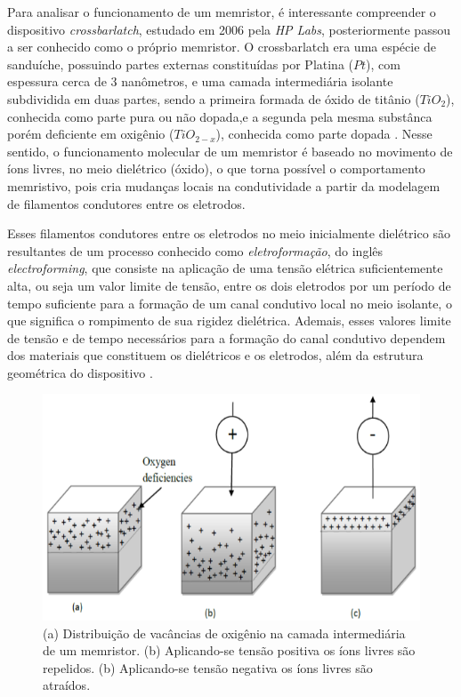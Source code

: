 \documentclass{ceel}
\begin{document}
\begin{multicols}{2}
Para analisar o funcionamento de um memristor, é interessante compreender o dispositivo \emph{crossbarlatch}, estudado em 2006 pela
\emph{HP Labs}, posteriormente passou a ser conhecido como o próprio memristor. O crossbarlatch era uma espécie de sanduíche, possuindo partes externas constituídas por Platina ($Pt$), com espessura cerca de 3 nanômetros, e uma camada intermediária isolante subdividida em duas partes, sendo a primeira formada de óxido de titânio ($TiO_2$), conhecida como parte pura ou não dopada,e a segunda pela mesma substânca porém deficiente em oxigênio ($TiO_{2-x}$), conhecida como parte dopada \cite{construcao}.  Nesse sentido, o funcionamento molecular de um memristor é baseado no movimento de íons livres, no meio dielétrico (óxido), o que torna possível o comportamento memristivo, pois cria mudanças locais na condutividade a partir da modelagem de filamentos condutores entre os eletrodos.

Esses filamentos condutores entre os eletrodos no meio inicialmente dielétrico são resultantes de um processo conhecido como \emph{eletroformação}, do inglês \emph{electroforming}, que consiste na aplicação de uma tensão elétrica suficientemente alta, ou seja um valor limite de tensão, entre os dois eletrodos por um período de tempo suficiente para a formação de um canal condutivo local no meio isolante, o que significa o rompimento de sua rigidez dielétrica.
Ademais, esses valores limite de tensão e de tempo necessários para a formação do canal condutivo dependem dos materiais que constituem os dielétricos e os eletrodos, além da estrutura geométrica do dispositivo \cite{us}. 

\vspace{-0.26cm}
\begin{figure}[H]
\centering
\includegraphics[width=\columnwidth]{oxygen-vacancies}
\caption{(a) Distribuição de vacâncias de oxigênio na camada intermediária de um memristor. (b) Aplicando-se tensão positiva os íons livres são repelidos. (b) Aplicando-se tensão negativa os íons livres são atraídos.}\label{estrutura}
\end{figure}


\end{multicols}
\end{document}
